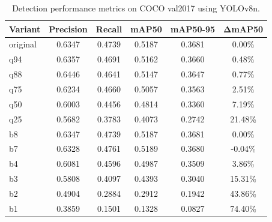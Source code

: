 \documentclass[12pt, a4paper]{article}
\begin{document}
\begin{table}[t]
\centering
\caption{Detection performance metrics on COCO val2017 using YOLOv8n.}
\label{tab:results_perf}

\begin{tabular}{|l|c|c|c|c|c|}
\hline
\textbf{Variant} & \textbf{Precision} & \textbf{Recall} & \textbf{mAP50} & \textbf{mAP50-95} & $\boldsymbol{\Delta}$\textbf{mAP50} \\ \hline

original & 0.6347 & 0.4739 & 0.5187 & 0.3681 & 0.00\% \\ \hline
q94 & 0.6357 & 0.4691 & 0.5162 & 0.3660 & 0.48\% \\ \hline
q88 & 0.6446 & 0.4641 & 0.5147 & 0.3647 & 0.77\% \\ \hline
q75 & 0.6234 & 0.4660 & 0.5057 & 0.3563 & 2.51\% \\ \hline
q50 & 0.6003 & 0.4456 & 0.4814 & 0.3360 & 7.19\% \\ \hline
q25 & 0.5682 & 0.3783 & 0.4073 & 0.2742 & 21.48\% \\ \hline
b8 & 0.6347 & 0.4739 & 0.5187 & 0.3681 & 0.00\% \\ \hline
b7 & 0.6328 & 0.4761 & 0.5189 & 0.3680 & -0.04\% \\ \hline
b4 & 0.6081 & 0.4596 & 0.4987 & 0.3509 & 3.86\% \\ \hline
b3 & 0.5808 & 0.4097 & 0.4393 & 0.3040 & 15.31\% \\ \hline
b2 & 0.4904 & 0.2884 & 0.2912 & 0.1942 & 43.86\% \\ \hline
b1 & 0.3859 & 0.1501 & 0.1328 & 0.0827 & 74.40\% \\ \hline

\end{tabular}
\end{table}
\end{document}
